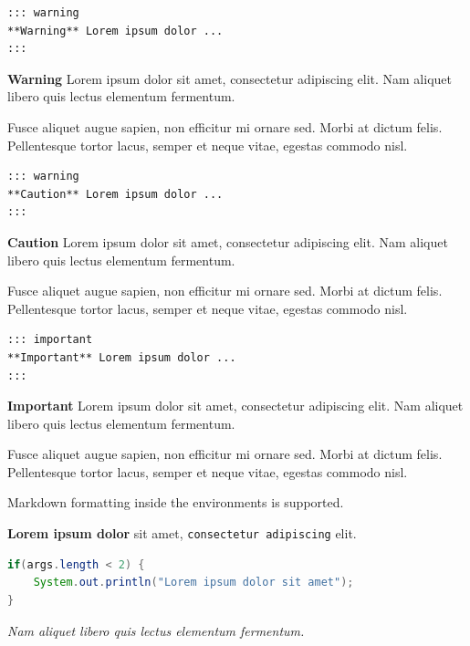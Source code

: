 \documentclass[
  a4paper,
  ,captions=tableheading
]{scrartcl}
\newcommand{\passthrough}[1]{#1}
\begin{document}
\begin{lstlisting}
::: warning
**Warning** Lorem ipsum dolor ...
:::
\end{lstlisting}

\begin{warningblock}
\textbf{Warning} Lorem ipsum dolor sit amet, consectetur adipiscing
elit. Nam aliquet libero quis lectus elementum fermentum.

Fusce aliquet augue sapien, non efficitur mi ornare sed. Morbi at dictum
felis. Pellentesque tortor lacus, semper et neque vitae, egestas commodo
nisl.
\end{warningblock}

\begin{lstlisting}
::: warning
**Caution** Lorem ipsum dolor ...
:::
\end{lstlisting}

\begin{cautionblock}
\textbf{Caution} Lorem ipsum dolor sit amet, consectetur adipiscing
elit. Nam aliquet libero quis lectus elementum fermentum.

Fusce aliquet augue sapien, non efficitur mi ornare sed. Morbi at dictum
felis. Pellentesque tortor lacus, semper et neque vitae, egestas commodo
nisl.
\end{cautionblock}

\begin{lstlisting}
::: important
**Important** Lorem ipsum dolor ...
:::
\end{lstlisting}

\begin{importantblock}
\textbf{Important} Lorem ipsum dolor sit amet, consectetur adipiscing
elit. Nam aliquet libero quis lectus elementum fermentum.

Fusce aliquet augue sapien, non efficitur mi ornare sed. Morbi at dictum
felis. Pellentesque tortor lacus, semper et neque vitae, egestas commodo
nisl.
\end{importantblock}

Markdown formatting inside the environments is supported.

\begin{importantblock}
\textbf{Lorem ipsum dolor} sit amet,
\passthrough{\lstinline!consectetur adipiscing!} elit.

\begin{lstlisting}[language=Java]
if(args.length < 2) {
    System.out.println("Lorem ipsum dolor sit amet");
}
\end{lstlisting}

\emph{Nam aliquet libero quis lectus elementum fermentum.}
\end{importantblock}
\end{document}
